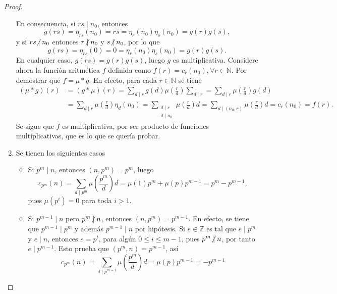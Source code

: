 \begin{proof}
\begin{enumerate}[label=\textnormal{(\arabic*)}]
En consecuencia, si $r s \mid n_0$, entonces
\begin{equation*}
    g(r s) = \eta_{r s}(n_0) = r s = \eta_r(n_0) \eta_s(n_0) = g(r) g(s),
\end{equation*}
y si $r s \centernot\mid n_0$ entonces $r \centernot\mid n_0$ y $s \centernot\mid n_0$, por lo que
\begin{equation*}
    g(r s) = \eta_{r s}(0) = 0 = \eta_r(n_0) \eta_s(n_0) = g(r) g(s).
\end{equation*}
En cualquier caso, $g(r s) = g(r) g(s)$, luego $g$ es multiplicativa. Considere ahora la función aritmética $f$ definida como $f(r) = c_r(n_0), \forall r \in \mathbb{N}$. Por demostrar que $f = \mu * g$. En efecto, para cada $r \in \mathbb{N}$ se tiene
\begin{align*}
    (\mu * g)(r) & = (g * \mu)(r) = \sum_{d \mid r} g \left( d \right) \mu \left(\frac{r}{d}  \right) \sum_{d \mid r} = \sum_{d \mid r} \mu \left( \frac{r}{d} \right) g(d) \\
                 &= \sum_{d \mid r} \mu \left( \frac{r}{d} \right) \eta_d(n_0)  = \sum_{\substack{d \mid r \\ d \mid n_0}} \mu \left( \frac{r}{d} \right) d = \sum_{d \mid (n_0,r)} \mu \left( \frac{r}{d} \right) d = c_r(n_0) = f(r).
\end{align*}
Se sigue que $f$ es multiplicativa, por ser producto de funciones multiplicativas, que es lo que se quería probar.
\item Se tienen los siguientes casos
\begin{itemize}
\item Si $p^m \mid n$, entonces $(n,p^m)=p^m$, luego
    \begin{equation*}
        c_{p^m}(n) = \sum_{d \mid p^m} \mu \left( \frac{p^m}{d} \right) d = \mu(1) p^m + \mu(p) p^{m-1} = p^m - p^{m-1},
    \end{equation*}
    pues $\mu(p^i)=0$ para toda $i > 1$.
\item Si $p^{m-1} \mid n$ pero $p^m \centernot\mid n$, entonces $(n,p^m)=p^{m-1}$. En efecto, se tiene que $p^{m-1} \mid p^m$ y además $p^{m-1} \mid n$ por hipótesis. Si $e \in \mathbb{Z}$ es tal que $e \mid p^{m}$ y $e \mid n$, entonces $e=p^i$, para algún $0 \le i \le m-1$, pues $p^m \centernot\mid n$, por tanto $e \mid p^{m-1}$. Esto prueba que $(p^m,n)=p^{m-1}$, así
    \begin{equation*}
        c_{p^m}(n) = \sum_{d \mid p^{m-1}} \mu \left( \frac{p^m}{d} \right) d = \mu(p) p^{m-1} = -p^{m-1}
    \end{equation*}
    

\end{itemize}
\end{enumerate}
\end{proof}
